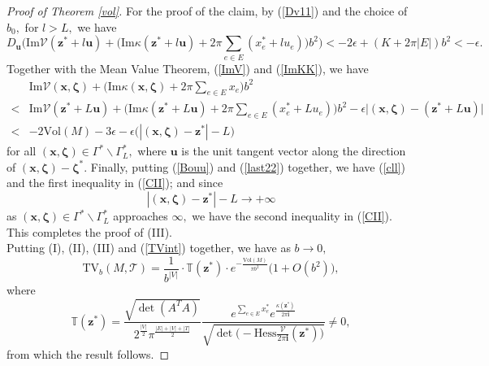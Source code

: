 \documentclass[11pt]{article}
\renewcommand{\setminus}{{\smallsetminus}}
\theoremstyle{remark}
\theoremstyle{remark}
\numberwithin{equation}{section}
\begin{document}
\begin{proof}[Proof of Theorem \ref{vol}]
For the proof of the claim, by (\ref{Dv11}) and the choice of $b_0,$ for $l>L,$ we have 
$$D_\mathbf u\bigg(\mathrm{Im}\mathcal V(\boldsymbol z^*+l\mathbf u)+\Big(\mathrm{Im}\kappa(\boldsymbol z^* + l\mathbf u) + 2\pi \sum_{e\in E} (x_e^*+ l u_e ) \Big)b^2\bigg)<-2\epsilon + (K+2\pi |E|)b^2<-\epsilon.$$
Together with the Mean Value Theorem, (\ref{ImV}) and (\ref{ImKK}), we have 
\begin{equation}\label{Bouu}
\begin{split}
&\mathrm{Im}\mathcal V(\boldsymbol  x,\boldsymbol \zeta)+\Big(\mathrm{Im}\kappa(\boldsymbol x,\boldsymbol \zeta)+ 2\pi \sum_{e\in E}x_e\Big)b^2\\
< & \mathrm{Im}\mathcal V(\boldsymbol z^*+ L\mathbf u) + \Big(\mathrm{Im}\kappa(\boldsymbol z^* + L\mathbf u) + 2\pi \sum_{e\in E} (x_e^*+ L u_e ) \Big)b^2 - \epsilon \big |  (\boldsymbol x,
\boldsymbol \zeta) - (\boldsymbol z^*+ L\mathbf u ) \big|\\
< & -2\mathrm{Vol }(M)-3\epsilon  -\epsilon\big(|(\boldsymbol x,
\boldsymbol \zeta)-\boldsymbol z^*|-L \big)
\end{split}
\end{equation}
for all $(\boldsymbol x,\boldsymbol \zeta )\in \Gamma^*\setminus \Gamma^*_L,$ where $\mathbf u$ is the unit tangent vector along the direction of $(\boldsymbol x,\boldsymbol \zeta)-\boldsymbol \zeta^*.$  Finally, putting (\ref{Bouu}) and (\ref{last22}) together, we have  (\ref{cll}) and the first  inequality in (\ref{CII}); and since 
$$|(\boldsymbol x,\boldsymbol \zeta)-\boldsymbol z^*|-L\to+\infty$$
as $(\boldsymbol x,\boldsymbol \zeta) \in \Gamma^*\setminus \Gamma^*_L$ approaches $\infty,$ we have the second inequality in (\ref{CII}). This completes the proof of (III).
\\

Putting (I), (II), (III) and (\ref{TVint}) together, we have as $b\to 0,$ 
$$\mathrm{TV}_b(M,\mathcal T) = \frac{1}{b^{|V|}}\cdot \mathbb T (\boldsymbol z^*)\cdot e^{-\frac{\mathrm{Vol}(M)}{\pi b^2}}\big(1+O(b^2)\big),
$$
where
$$\mathbb T(\boldsymbol z^*) =   \frac{\sqrt{\det (A^TA)}}{2^{\frac{|V|}{2}}\pi^{\frac{|E|+|V|+|T|}{2}}}\frac{e^{\sum_{e\in E}x^*_e} e^{ \frac{\kappa(\boldsymbol z^*)}{2\pi \mathbf i} }}{\sqrt{\det\Big(-\mathrm{Hess}\frac{\mathcal V}{2\pi \mathbf i}(\boldsymbol z^*)\Big)}}\neq 0,$$
from which the result follows. 
\end{proof}
\end{document}
